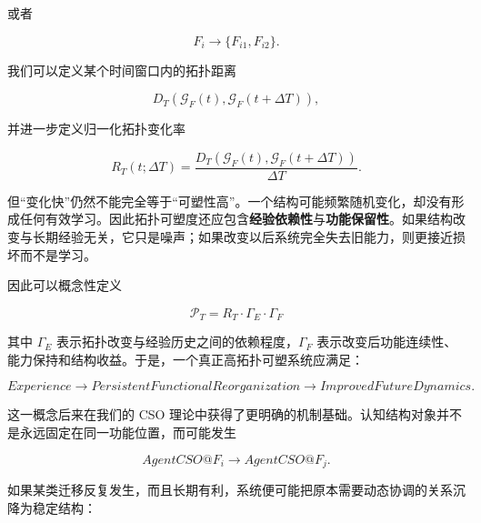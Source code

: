 或者

\begin{equation}
F_i
\rightarrow
\{F_{i1},F_{i2}\}.
\end{equation}

我们可以定义某个时间窗口内的拓扑距离

\begin{equation}
D_T
\left(
\mathcal{G}_F(t),
\mathcal{G}_F(t+\Delta T)
\right),
\end{equation}

并进一步定义归一化拓扑变化率

\begin{equation}
R_T(t;\Delta T)
=
\frac{
D_T\left(
\mathcal{G}_F(t),
\mathcal{G}_F(t+\Delta T)
\right)
}{
\Delta T
}.
\end{equation}

但“变化快”仍然不能完全等于“可塑性高”。一个结构可能频繁随机变化，却没有形成任何有效学习。因此拓扑可塑度还应包含\textbf{经验依赖性}与\textbf{功能保留性}。如果结构改变与长期经验无关，它只是噪声；如果改变以后系统完全失去旧能力，则更接近损坏而不是学习。

因此可以概念性定义

\begin{equation}
\boxed{
\mathcal{P}_T
=
R_T
\cdot
\Gamma_E
\cdot
\Gamma_F
}
\end{equation}

其中 $\Gamma_E$ 表示拓扑改变与经验历史之间的依赖程度，$\Gamma_F$ 表示改变后功能连续性、能力保持和结构收益。于是，一个真正高拓扑可塑系统应满足：

\begin{equation}
Experience
\rightarrow
PersistentFunctionalReorganization
\rightarrow
ImprovedFutureDynamics.
\end{equation}

这一概念后来在我们的 CSO 理论中获得了更明确的机制基础。认知结构对象并不是永远固定在同一功能位置，而可能发生

\begin{equation}
AgentCSO@F_i
\rightarrow
AgentCSO@F_j.
\end{equation}

如果某类迁移反复发生，而且长期有利，系统便可能把原本需要动态协调的关系沉降为稳定结构：

\begin{statementbox}
\centering
{}
\end{statementbox}

